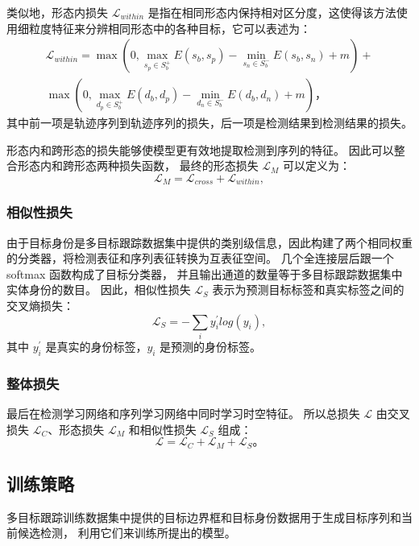 类似地，形态内损失 $ \mathcal{L}_{within} $ 是指在相同形态内保持相对区分度，这使得该方法使用细粒度特征来分辨相同形态中的各种目标，它可以表述为：
\begin{equation}\label{eq:I2Iloss}
\begin{aligned}
\mathcal{L}_{within}= \max(0, \max_{s_p\in S_b^+} E(s_b, s_p) - \min_{s_n\in S_b^-} E(s_b, s_n) + m ) + \\
\max (0, \max_{d_p\in S_b^+} E(d_b, d_p) - \min_{d_n\in S_b^-} E(d_b, d_n) + m ) \mbox{，}
\end{aligned}
\end{equation}
其中前一项是轨迹序列到轨迹序列的损失，后一项是检测结果到检测结果的损失。

形态内和跨形态的损失能够使模型更有效地提取检测到序列的特征。
因此可以整合形态内和跨形态两种损失函数，
最终的形态损失 $\mathcal{L}_{M}$ 可以定义为：
\begin{equation}\label{eq:tripletloss}
\mathcal{L}_{M}= \mathcal{L}_{cross}+\mathcal{L}_{within},
\end{equation}


\subsubsection{相似性损失}
由于目标身份是多目标跟踪数据集中提供的类别级信息，因此构建了两个相同权重的分类器，将检测表征和序列表征转换为互表征空间。
几个全连接层后跟一个 softmax 函数构成了目标分类器，
并且输出通道的数量等于多目标跟踪数据集中实体身份的数目。
因此，相似性损失 $\mathcal{L}_{S}$ 表示为预测目标标签和真实标签之间的交叉熵损失：
\begin{equation}\label{eq:cross_entropy}
\mathcal{L}_{S}=- \sum_{i} y_{i}^{'}log(y_i),
\end{equation}
其中 $y_{i}^{'}$ 是真实的身份标签，$y_{i}$ 是预测的身份标签。


\subsubsection{整体损失}
最后在检测学习网络和序列学习网络中同时学习时空特征。
所以总损失 $ \mathcal{L} $ 由交叉损失 $ \mathcal{L}_{C} $、形态损失 $ \mathcal{L}_{M} $ 和相似性损失 $ \mathcal{L}_{S} $ 组成：
\begin{equation}\label{eq:loss}
\mathcal{L}=
\mathcal{L}_{C} + 
\mathcal{L}_{M} + \mathcal{L}_{S} \mbox{。}
\end{equation}



\subsection{训练策略}
\label{sec:training_strategy}
多目标跟踪训练数据集中提供的目标边界框和目标身份数据用于生成目标序列和当前候选检测，
利用它们来训练所提出的模型。

